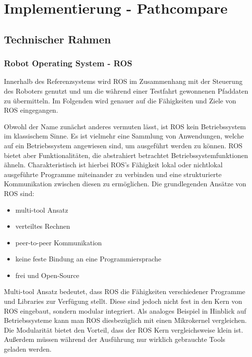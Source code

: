 \chapter{Implementierung - Pathcompare}
\label{sec:implementierung}
\section{Technischer Rahmen}

\subsection{Robot Operating System - ROS}

Innerhalb des Referenzsystems wird \gls{ROS} im Zusammenhang mit der Steuerung
des Roboters genutzt und um die während einer Testfahrt gewonnenen Pfaddaten
zu übermitteln. Im Folgenden wird genauer auf die Fähigkeiten und
Ziele von ROS eingegangen.

Obwohl der Name zunächst anderes vermuten lässt, ist ROS kein
Betriebssystem im klassischem Sinne. Es ist vielmehr eine Sammlung von
Anwendungen, welche auf ein Betriebssystem angewiesen sind, um ausgeführt werden
zu können. ROS bietet aber Funktionalitäten, die abstrahiert betrachtet
Betriebssystemfunktionen ähneln. Charakteristisch ist hierbei ROS's Fähigkeit
lokal oder nichtlokal ausgeführte Programme miteinander zu verbinden und eine
strukturierte Kommunikation zwischen diesen zu ermöglichen. Die grundlegenden
Ansätze von ROS sind:

\begin{itemize}
  \item multi-tool Ansatz
  \item verteiltes Rechnen 
  \item peer-to-peer Kommunikation
  \item keine feste Bindung an eine Programmiersprache
  \item frei und Open-Source
\end{itemize}

Multi-tool Ansatz bedeutet, dass ROS die Fähigkeiten verschiedener Programme
und Libraries zur Verfügung stellt. Diese sind jedoch nicht fest in den Kern
von ROS eingebaut, sondern modular integriert. Als analoges Beispiel in
Hinblick auf Betriebssysteme kann man ROS diesbezüglich mit einen Mikrokernel
vergleichen. Die Modularität bietet den Vorteil, dass der ROS Kern
vergleichsweise klein ist. Außerdem müssen während der Ausführung nur wirklich
gebrauchte Tools geladen werden.


